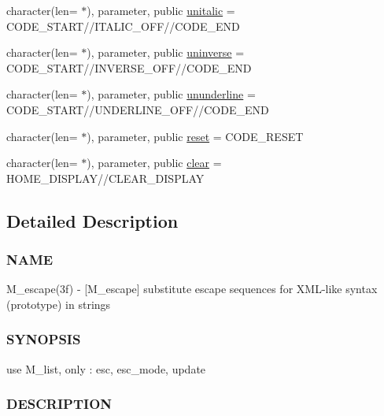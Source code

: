 \begin{DoxyCompactItemize}
\item 
character(len= $\ast$), parameter, public \mbox{\hyperlink{namespacem__escape_a6b95826bb2793069e7fa8f8386bdb520}{unitalic}} = C\+O\+D\+E\+\_\+\+S\+T\+A\+RT//I\+T\+A\+L\+I\+C\+\_\+\+O\+FF//C\+O\+D\+E\+\_\+\+E\+ND
\item 
character(len= $\ast$), parameter, public \mbox{\hyperlink{namespacem__escape_a067207898e3ef5118bc1cad83f40dad8}{uninverse}} = C\+O\+D\+E\+\_\+\+S\+T\+A\+RT//I\+N\+V\+E\+R\+S\+E\+\_\+\+O\+FF//C\+O\+D\+E\+\_\+\+E\+ND
\item 
character(len= $\ast$), parameter, public \mbox{\hyperlink{namespacem__escape_adbaa599772d5df6567d75188ac3258bf}{ununderline}} = C\+O\+D\+E\+\_\+\+S\+T\+A\+RT//U\+N\+D\+E\+R\+L\+I\+N\+E\+\_\+\+O\+FF//C\+O\+D\+E\+\_\+\+E\+ND
\item 
character(len= $\ast$), parameter, public \mbox{\hyperlink{namespacem__escape_ae02be34bb084db8024b234bc87058d3a}{reset}} = C\+O\+D\+E\+\_\+\+R\+E\+S\+ET
\item 
character(len= $\ast$), parameter, public \mbox{\hyperlink{namespacem__escape_a49210f3a0332fb37df08c519b3252bef}{clear}} = H\+O\+M\+E\+\_\+\+D\+I\+S\+P\+L\+AY//C\+L\+E\+A\+R\+\_\+\+D\+I\+S\+P\+L\+AY
\end{DoxyCompactItemize}


\subsection{Detailed Description}
\subsubsection*{N\+A\+ME}

M\+\_\+escape(3f) -\/ \mbox{[}M\+\_\+escape\mbox{]} substitute escape sequences for X\+M\+L-\/like syntax (prototype) in strings 

\subsubsection*{S\+Y\+N\+O\+P\+S\+IS}

\begin{DoxyVerb} use M_list, only : esc, esc_mode, update
\end{DoxyVerb}


\subsubsection*{D\+E\+S\+C\+R\+I\+P\+T\+I\+ON}

